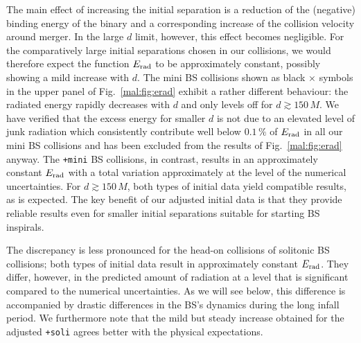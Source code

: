 The main effect of increasing the initial separation is a
reduction of the (negative) binding energy of the binary and a corresponding
increase of the collision velocity around merger. In the large
$d$ limit, however, this effect becomes negligible. For the
comparatively large initial separations chosen in our
collisions, we would therefore
expect the function $E_{\rm rad}$ to be approximately constant,
possibly showing a mild increase with $d$. The mini BS collisions
shown as black $\times$ symbols in the upper panel of
Fig.~\ref{mal:fig:erad} exhibit a rather different behaviour:
the radiated energy rapidly decreases with $d$ and only levels
off for $d\gtrsim 150\,M$. We have verified that the excess
energy for smaller $d$ is not due to an elevated level of
junk radiation which consistently contribute well below 
$0.1\,\%$ of $E_{\rm rad}$ in all our mini BS collisions and has
been excluded from the results of Fig.~\ref{mal:fig:erad} anyway.
The {\tt +mini} BS collisions,
in contrast, results in an approximately constant $E_{\rm rad}$
with a total variation approximately at the level of the
numerical uncertainties. For $d\gtrsim 150\,M$, both types of
initial data yield compatible results, as is expected.
The key benefit of our adjusted initial data is that they provide
reliable results even for smaller initial separations suitable
for starting BS inspirals.

The discrepancy is less pronounced for the head-on collisions
of solitonic BS collisions; both types of initial data result
in approximately constant $E_{\rm rad}$. They differ, however,
in the predicted amount of radiation at a level that
is significant compared to
the numerical uncertainties. As we will see below, this difference
is accompanied by drastic differences in the BS's dynamics during the
long infall period. We furthermore note that the mild but
steady increase obtained for the adjusted {\tt +soli} agrees
better with the physical expectations.

